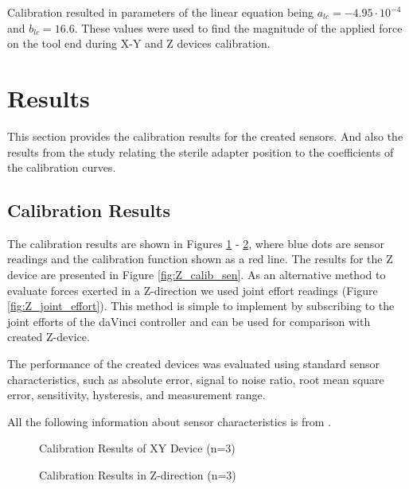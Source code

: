 	Calibration resulted in parameters of the linear equation being  $a_{lc} = -4.95 \cdot 10^{-4}$ and $b_{lc} = 16.6$. These values were used to find the magnitude of the applied force on the tool end during X-Y and Z devices calibration.

\section{Results}
\label{sec:res}
This section provides the calibration results for the created sensors. And also the results from the study relating the sterile adapter position to the coefficients of the calibration curves.

\subsection{Calibration Results}
\label{ssec:Cal_Res}

The calibration results are shown in Figures \ref{fig:XY_calib_res} - \ref{fig:Z_calib_res}, where blue dots are sensor readings and the calibration function shown as a red line. The results for the Z device are presented in Figure \ref{fig:Z_calib_sen}. As an alternative method to evaluate forces exerted in a Z-direction we used joint effort readings (Figure \ref{fig:Z_joint_effort}). This method is simple to implement by subscribing to the joint efforts of the daVinci controller and can be used for comparison with created Z-device.

The performance of the created devices was evaluated using standard sensor characteristics, such as absolute error, signal to noise ratio, root mean square error, sensitivity, hysteresis, and measurement range.

All the following information about sensor characteristics is from \cite{kalantar-zadeh_sensors_2013}.

\begin{figure}[h]%
\centering
{}%
\qquad
{}%
\caption{Calibration Results of XY Device (n=3)}
\label{fig:XY_calib_res}%
\end{figure}

\begin{figure}[h]%
\centering
{}%
\qquad
{}%
\caption{Calibration Results in Z-direction (n=3)}
\label{fig:Z_calib_res}%
\end{figure}


